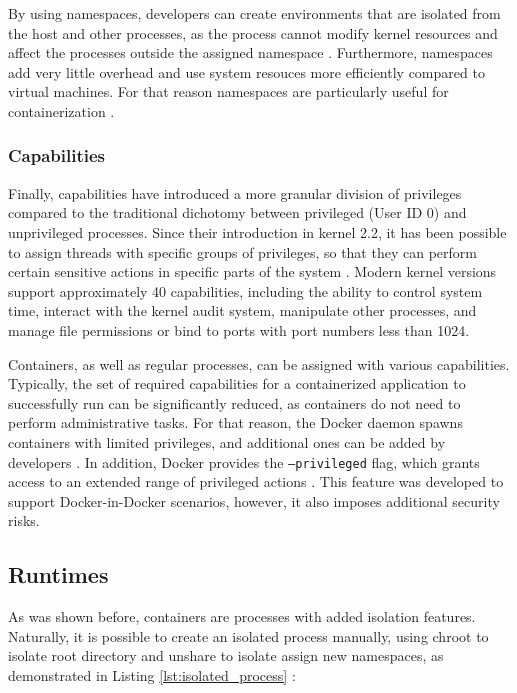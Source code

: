 By using namespaces, developers can create environments that are isolated from the host and other processes, as the process cannot modify kernel resources and affect the processes outside the assigned namespace \cite{d:dockersecurity}. Furthermore, namespaces add very little overhead and use system resouces more efficiently compared to virtual machines. For that reason namespaces are particularly useful for containerization \cite{c:1}.

\subsubsection{Capabilities}

Finally, capabilities have introduced a more granular division of privileges compared to the traditional dichotomy between privileged (User ID 0) and unprivileged processes. Since their introduction in kernel 2.2, it has been possible to assign threads with specific groups of privileges, so that they can perform certain sensitive actions in specific parts of the system \cite{m:capabilities}. Modern kernel versions support approximately 40 capabilities, including the ability to control system time, interact with the kernel audit system, manipulate other processes, and manage file permissions or bind to ports with port numbers less than 1024.

Containers, as well as regular processes, can be assigned with various capabilities. Typically, the set of required capabilities for a containerized application to successfully run can be significantly reduced, as containers do not need to perform administrative tasks. For that reason, the Docker daemon spawns containers with limited privileges, and additional ones can be added by developers \cite{d:dockersecurity}. In addition, Docker provides the \texttt{--privileged} flag, which grants access to an extended range of privileged actions \cite{d:dockerrun}. This feature was developed to support Docker-in-Docker scenarios, however, it also imposes additional security risks.

\clearpage
\subsection{Runtimes}

As was shown before, containers are processes with added isolation features. Naturally, it is possible to create an isolated process manually, using chroot to isolate root directory and unshare to isolate assign new namespaces, as demonstrated in Listing \ref{lst:isolated_process} \cite{book:rice}:

